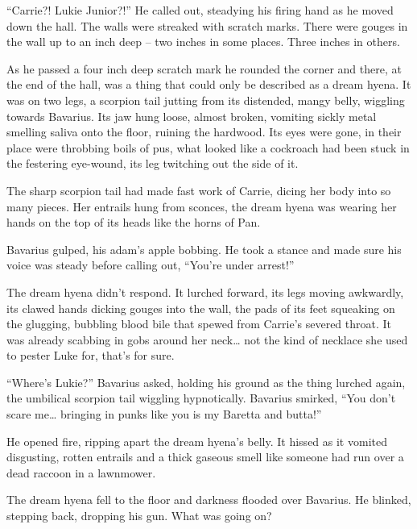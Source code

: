 ``Carrie?! Lukie Junior?!'' He called out, steadying his firing hand
as he moved down the hall. The walls were streaked with scratch
marks. There were gouges in the wall up to an inch deep -- two
inches in some places. Three inches in others.



As he passed a four inch deep scratch mark he rounded the corner
and there, at the end of the hall, was a thing that could only be
described as a dream hyena. It was on two legs, a scorpion tail
jutting from its distended, mangy belly, wiggling towards Bavarius.
Its jaw hung loose, almost broken, vomiting sickly metal smelling
saliva onto the floor, ruining the hardwood. Its eyes were gone, in
their place were throbbing boils of pus, what looked like a
cockroach had been stuck in the festering eye-wound, its leg
twitching out the side of it.



The sharp scorpion tail had made fast work of Carrie, dicing her
body into so many pieces. Her entrails hung from sconces, the dream
hyena was wearing her hands on the top of its heads like the horns
of Pan.



Bavarius gulped, his adam's apple bobbing. He took a stance and
made sure his voice was steady before calling out, ``You're under
arrest!''



The dream hyena didn't respond. It lurched forward, its legs moving
awkwardly, its clawed hands dicking gouges into the wall, the pads
of its feet squeaking on the glugging, bubbling blood bile that
spewed from Carrie's severed throat. It was already scabbing in
gobs around her neck{\ldots} not the kind of necklace she used to pester
Luke for, that's for sure.



``Where's Lukie?'' Bavarius asked, holding his ground as the thing
lurched again, the umbilical scorpion tail wiggling hypnotically.
Bavarius smirked, ``You don't scare me{\ldots} bringing in punks like you
is my Baretta and butta!''



He opened fire, ripping apart the dream hyena's belly. It hissed as
it vomited disgusting, rotten entrails and a thick gaseous smell
like someone had run over a dead raccoon in a lawnmower.



The dream hyena fell to the floor and darkness flooded over
Bavarius. He blinked, stepping back, dropping his gun. What was
going on?




